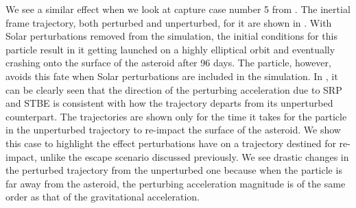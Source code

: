 We see a similar effect when we look at capture case number 5 from . The inertial frame trajectory, both perturbed and unperturbed, for it are shown in . With Solar perturbations removed from the simulation, the initial conditions for this particle result in it getting launched on a highly elliptical orbit and eventually crashing onto the surface of the asteroid after 96 days. The particle, however, avoids this fate when Solar perturbations are included in the simulation. In , it can be clearly seen that the direction of the perturbing acceleration due to \gls{SRP} and \gls{STBE} is consistent with how the trajectory departs from its unperturbed counterpart. The trajectories are shown only for the time it takes for the particle in the unperturbed trajectory to re-impact the surface of the asteroid. We show this case to highlight the effect perturbations have on a trajectory destined for re-impact, unlike the escape scenario discussed previously. We see drastic changes in the perturbed trajectory from the unperturbed one because when the particle is far away from the asteroid, the perturbing acceleration magnitude is of the same order as that of the gravitational acceleration.
